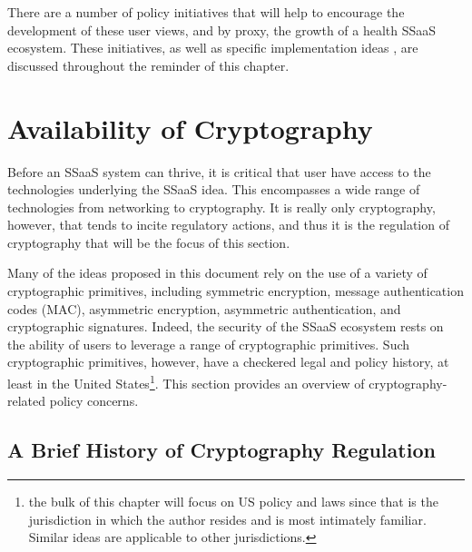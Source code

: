 There are a number of policy initiatives that will help to encourage
the development of these user views, and by proxy, the growth of a
health SSaaS ecosystem. These initiatives, as well as specific
implementation ideas , are discussed throughout the reminder of this
chapter.

\section{Availability of Cryptography}
\label{chap:policy:crypto}

Before an SSaaS system can thrive, it is critical that user have
access to the technologies underlying the SSaaS idea. This encompasses
a wide range of technologies from networking to cryptography. It is
really only cryptography, however, that tends to incite regulatory
actions, and thus it is the regulation of cryptography that will be
the focus of this section.

Many of the ideas proposed in this document rely on the use of a
variety of cryptographic primitives, including symmetric encryption,
message authentication codes (MAC), asymmetric encryption, asymmetric
authentication, and cryptographic signatures. Indeed, the security of
the SSaaS ecosystem rests on the ability of users to leverage a range
of cryptographic primitives. Such cryptographic primitives, however,
have a checkered legal and policy history, at least in the United
States\footnote{the bulk of this chapter will focus on US policy and
  laws since that is the jurisdiction in which the author resides and
  is most intimately familiar. Similar ideas are applicable to other
  jurisdictions.}. This section provides an overview of
cryptography-related policy concerns.

\subsection{A Brief History of Cryptography Regulation}

